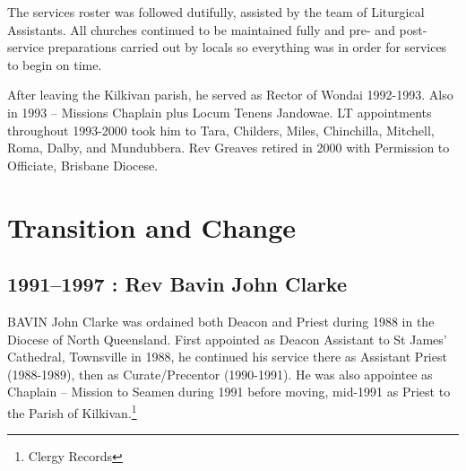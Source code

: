 The services roster was followed dutifully, assisted by the team of Liturgical Assistants. All churches continued to be maintained fully and pre- and post-service preparations carried out by locals so everything was in order for services to begin on time.



After leaving the Kilkivan parish, he served as Rector of Wondai 1992-1993. Also in 1993 -- Missions Chaplain plus Locum Tenens Jandowae. LT appointments throughout 1993-2000 took him to Tara, Childers, Miles, Chinchilla, Mitchell, Roma, Dalby, and Mundubbera. Rev Greaves retired in 2000 with Permission to Officiate, Brisbane Diocese.



\balance


\printendnotes[custom]
\setcounter{endnote}{0}
\chapter{Transition and Change}
\nobalance


\section{1991--1997 : Rev Bavin John Clarke}



\lettrine[lines=3]{B}{AVIN}
 John Clarke was ordained both Deacon and Priest during 1988 in the Diocese of North Queensland. First appointed as Deacon Assistant to St James' Cathedral, Townsville in 1988, he continued his service there as Assistant Priest (1988-1989), then as Curate/Precentor (1990-1991). He was also appointee as Chaplain -- Mission to Seamen during 1991 before moving, mid-1991 as Priest to the Parish of Kilkivan.\footnote{Clergy Records}







